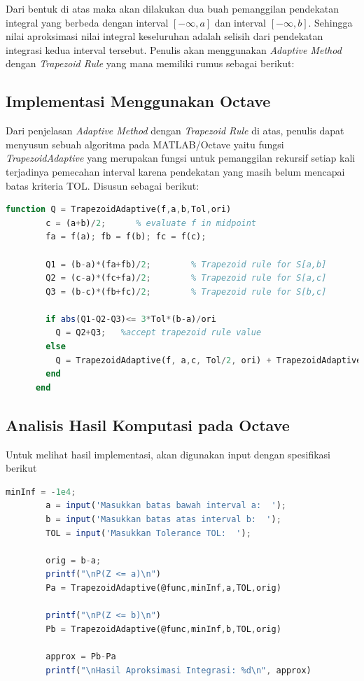 \documentclass[journal,12pt,onecolumn,a4paper]{IEEEtran}
\begin{document}
Dari bentuk di atas maka akan dilakukan dua buah pemanggilan pendekatan integral yang berbeda dengan interval \([-\infty, a]\) dan interval \([-\infty, b]\). Sehingga nilai aproksimasi nilai integral keseluruhan adalah selisih dari pendekatan integrasi kedua interval tersebut.
Penulis akan menggunakan \emph{Adaptive Method} dengan \emph{Trapezoid Rule} yang mana memiliki rumus sebagai berikut:

\subsection{Implementasi Menggunakan Octave}

Dari penjelasan \emph{Adaptive Method} dengan \emph{Trapezoid Rule} di atas, penulis dapat menyusun sebuah algoritma pada MATLAB/Octave yaitu fungsi \emph{TrapezoidAdaptive} yang merupakan fungsi untuk pemanggilan rekursif setiap kali terjadinya pemecahan interval karena pendekatan yang masih belum mencapai batas kriteria TOL. Disusun sebagai berikut:
\begin{center}
	\begin{lstlisting}[language=Octave]
		function Q = TrapezoidAdaptive(f,a,b,Tol,ori)
		c = (a+b)/2;      % evaluate f in midpoint
		fa = f(a); fb = f(b); fc = f(c);
	  
		Q1 = (b-a)*(fa+fb)/2;        % Trapezoid rule for S[a,b]
		Q2 = (c-a)*(fc+fa)/2;        % Trapezoid rule for S[a,c]
		Q3 = (b-c)*(fb+fc)/2;        % Trapezoid rule for S[b,c]
	  
		if abs(Q1-Q2-Q3)<= 3*Tol*(b-a)/ori
		  Q = Q2+Q3;   %accept trapezoid rule value
		else
		  Q = TrapezoidAdaptive(f, a,c, Tol/2, ori) + TrapezoidAdaptive(f,c,b, Tol/2, ori); % use algorithm for [a,c] and [c,b]
		end
	  end
	\end{lstlisting}
\end{center}

\subsection{Analisis Hasil Komputasi pada Octave}

Untuk melihat hasil implementasi, akan digunakan input dengan spesifikasi berikut

\begin{center}
	\begin{lstlisting}[language=Octave]
		minInf = -1e4;
		a = input('Masukkan batas bawah interval a:  ');
		b = input('Masukkan batas atas interval b:  ');
		TOL = input('Masukkan Tolerance TOL:  ');

		orig = b-a;
		printf("\nP(Z <= a)\n")
		Pa = TrapezoidAdaptive(@func,minInf,a,TOL,orig)

		printf("\nP(Z <= b)\n")
		Pb = TrapezoidAdaptive(@func,minInf,b,TOL,orig)

		approx = Pb-Pa
		printf("\nHasil Aproksimasi Integrasi: %d\n", approx)
	\end{lstlisting}
\end{center}
\end{document}
